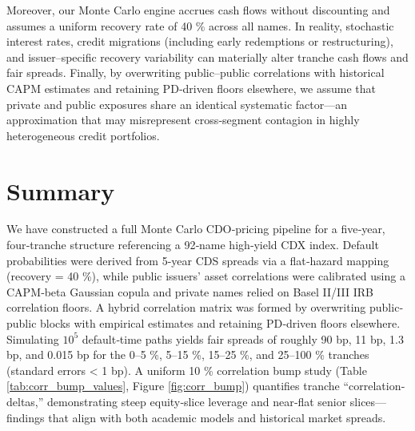 \documentclass[
	a4paper,         %
	12pt,            %
	unnumberedsections,  %
	twoside,         %
]{LTJournalArticle}
\begin{document}
Moreover, our Monte Carlo engine accrues cash flows without discounting and assumes a uniform recovery rate of 40 \% across all names.  In reality, stochastic interest rates, credit migrations (including early redemptions or restructuring), and issuer–specific recovery variability can materially alter tranche cash flows and fair spreads.  Finally, by overwriting public–public correlations with historical CAPM estimates and retaining PD‐driven floors elsewhere, we assume that private and public exposures share an identical systematic factor—an approximation that may misrepresent cross‐segment contagion in highly heterogeneous credit portfolios.  


\section{Summary}
We have constructed a full Monte Carlo CDO‐pricing pipeline for a five‐year, four‐tranche structure referencing a 92‐name high‐yield CDX index. Default probabilities were derived from 5-year CDS spreads via a flat‐hazard mapping (recovery = 40 \%), while public issuers’ asset correlations were calibrated using a CAPM‐beta Gaussian copula and private names relied on Basel II/III IRB correlation floors. A hybrid correlation matrix was formed by overwriting public‐public blocks with empirical estimates and retaining PD‐driven floors elsewhere. Simulating \(10^5\) default‐time paths yields fair spreads of roughly 90 bp, 11 bp, 1.3 bp, and 0.015 bp for the 0–5 \%, 5–15 \%, 15–25 \%, and 25–100 \% tranches (standard errors < 1 bp). A uniform 10 \% correlation bump study (Table \ref{tab:corr_bump_values}, Figure \ref{fig:corr_bump}) quantifies tranche “correlation‐deltas,” demonstrating steep equity‐slice leverage and near‐flat senior slices—findings that align with both academic models and historical market spreads.



\clearpage
\printbibliography

\clearpage %
\appendix %
\end{document}
